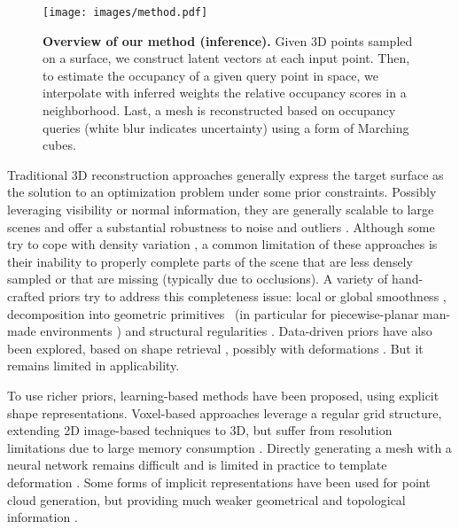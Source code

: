 \documentclass[10pt,twocolumn,letterpaper]{article}
\begin{document}
\begin{figure*}[t]
    \centering
    \texttt{[image: images/method.pdf]}
    \caption{\textbf{Overview of our method (inference).} Given 3D points sampled on a surface, we construct latent vectors at each input point. Then, to estimate the occupancy of a given query point in space, we interpolate with inferred weights the relative occupancy scores in a neighborhood. Last, a mesh is reconstructed based on occupancy queries (white blur indicates uncertainty) using a form of Marching cubes\rlap.} \label{fig:pipeline}
\end{figure*}


Traditional 3D reconstruction approaches \cite{Berger2014EG} generally express the target surface as the solution to an optimization problem under some prior constraints. Possibly leveraging visibility or normal information, they are generally scalable to large scenes and offer a substantial robustness to noise and outliers \cite{Labatut2009CGF,Mullen2010CGF,Vu2012PAMI,Kazhdan2013SIGGRAPH,Zhou2019Sensors,Sulzer2021Scalable,Williams2021NeuralSplines,Poliarnyi2021Outofcore}. 
Although some try to cope with density variation \cite{Jancosek2011CVPR,Jancosek2014ISRN, BodisSzomoru2016ICPR}, a common limitation of these approaches is their inability to properly complete parts of the scene that are less densely sampled or that are missing (typically due to occlusions). A variety of hand-crafted priors try to address this completeness issue: local or global smoothness \cite{Lipman2007SGP}, decomposition into geometric primitives~\cite{Schnabel2009CGF} (in particular for piecewise-planar man-made environments \cite{Chauve2010CVPR,Lafarge2013EG,Boulch2014SGP,Nan2017ICCV, Bauchet2020TOG}) and structural regularities \cite{Pauly2008TOG,Li2011TOG}. Data-driven priors have also been explored, based on shape retrieval \cite{Gal2007CGF}, possibly with deformations \cite{Nan2012TOG}. But it remains limited in applicability.

To use richer priors, learning-based methods have been proposed, using explicit shape representations. Voxel-based approaches leverage a regular grid structure, extending 2D image-based techniques to 3D, but suffer from resolution limitations due to large memory consumption \cite{Maturana2015IROS,Choy2016ECCV,Wu2016NIPS}.  Directly generating a mesh with a neural network remains difficult \cite{Gkioxari2019ICCV} and is limited in practice to template deformation \cite{Groueix2018CVPR}.
Some forms of implicit representations have been used for point cloud generation, but providing much weaker geometrical and topological information \cite{Fan2017CVPR,Lin2018AAAI,Yang2019ICCV}. 
\end{document}
